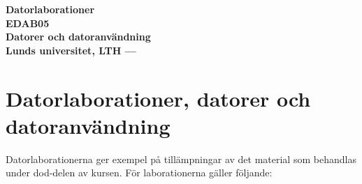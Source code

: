 \documentclass[fleqn, article, a4paper]{memoir}
\author{}
\begin{document}
\clearpage
\thispagestyle{empty} %
\vspace*{30mm}
\begin{center}
	\sffamily
	\renewcommand{\baselinestretch}{1.1}
	\Huge\bfseries Datorlaborationer \\[5mm]
	EDAB05 \\[2mm]
	\LARGE\bfseries	Datorer och datoranvändning \\[7mm]
	\large Lunds universitet, LTH --- \the\year
\end{center}
\clearpage


\maketitle
\thispagestyle{titlepage}
\vspace{-4cm}
\section*{Datorlaborationer, datorer och datoranvändning}

Datorlaborationerna ger exempel på tillämpningar av det material som behandlas under dod-delen av kursen. För laborationerna gäller följande:
\end{document}
